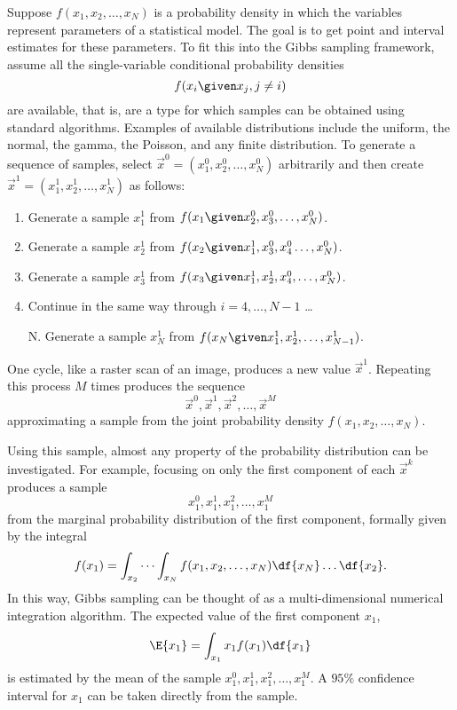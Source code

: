 \documentclass[12pt]{article}
\begin{document}
Suppose \( f(x_1, x_2, \dots, x_N) \) is a probability density in
which the variables represent parameters of a statistical model.  The
goal is to get point and interval estimates for these parameters.  To
fit this into the Gibbs sampling framework, assume all the
single-variable conditional probability densities
\[
    f(x_i \given x_j, j \ne i)
\] are available, that is, are a type for which samples can be obtained
using standard algorithms.  Examples of available distributions include
the uniform, the normal, the gamma, the Poisson, and any finite
distribution.  To generate a sequence of samples, select \(
\overrightarrow{x}^0 = (x_1^0, x_2^0, \dots, x_N^0) \) arbitrarily and
then create \( \overrightarrow{x}^1 = (x_1^1, x_2^1, \dots, x_N^1) \) as
follows:
\begin{enumerate}
    \item
        Generate a sample \( x_1^1 \) from \( f(x_1 \given x_2^0, x_3^0,
        \dots, x_N^0) \).
    \item
        Generate a sample \( x_2^1 \) from \( f(x_2 \given x_1^1, x_3^0,x_4^
        {0} \dots, x_N^0) \).
    \item
        Generate a sample \( x_3^1 \) from \( f(x_3 \given x_1^1, x_2^1,
        x_4^0, \dots, x_N^0) \).
    \item
        Continue in the same way through \( i = 4, \dots, N-1 \) \dots
    \item[N.]
        Generate a sample \( x_N^1 \) from \( f(x_N \given x_1^1, x_2^1,
        \dots, x_{N-1}^1) \).
\end{enumerate}
One cycle, like a raster scan of an image, produces a new value \(
\overrightarrow{x}^1 \).  Repeating this process \( M \) times
produces the sequence
\[
    \overrightarrow{x}^0, \overrightarrow{x}^1, \overrightarrow{x}^2,
    \dots, \overrightarrow{x}^M
\] approximating a sample from the joint probability density \(
f(x_1, x_2, \dots, x_N) \).

Using this sample, almost any property of the probability distribution
can be investigated.  For example, focusing on only the first component
of each \( \overrightarrow{x}^k \) produces a sample
\[
    x_1^0, x_1^1, x_1^2,\dots, x_1^M
\] from the marginal probability distribution of the first component,
formally given by the integral
\[
    f(x_1) = \int_{x_2}\cdots \int_{x_N} f(x_1, x_2, \dots, x_N) \df{x_N}
    \dots \df{x_2}.
\] In this way, Gibbs sampling can be thought of as a multi-dimensional
numerical integration algorithm.  The expected value of the first
component \( x_1 \),
\[
    \E{x_1} = \int_{x_1} x_1 f(x_1) \df{x_1}
\] is estimated by the mean of the sample \( x_1^0, x_1^1, x_1^2,\dots,
x_1^M \).  A \( 95\% \) confidence interval for \( x_1 \) can be taken
directly from the sample.
\end{document}
